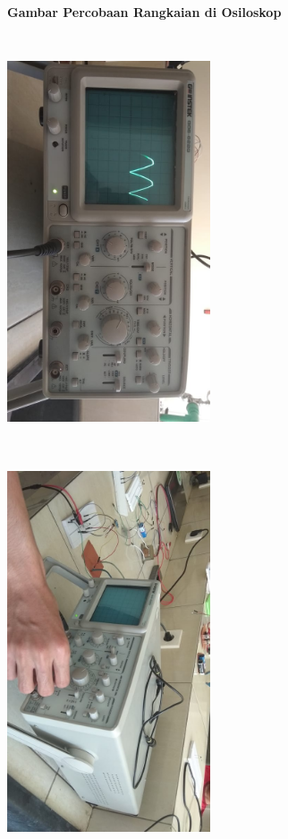 \documentclass[12pt,a4paper]{article}
\begin{document}
\vspace{2cm}

\newpage
\begin{figure}
\paragraph{Gambar Percobaan Rangkaian di Osiloskop}
\paragraph{ }
\begin{center}
\includegraphics[width=6cm, height=12cm]{g4.png}
\includegraphics[width=6cm, height=12cm]{g5.png}

\end{center}
\end{figure}
\end{document}

